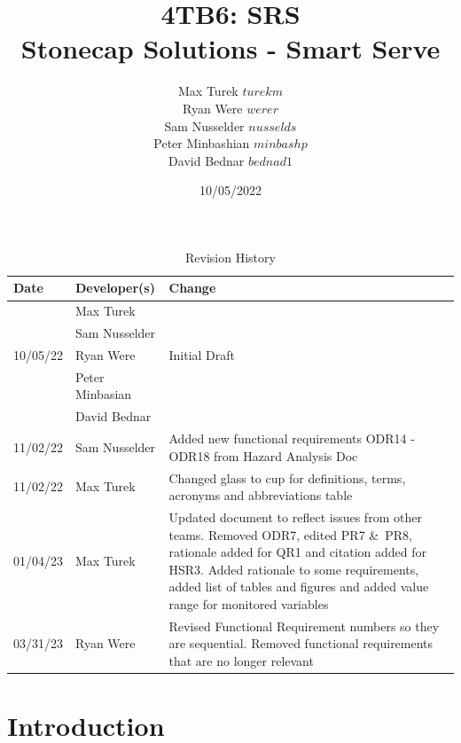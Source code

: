 \documentclass{article}
\title{\textbf{4TB6: SRS}\\
\addlinespace
\addlinespace
\addlinespace
\addlinespace
\large \textbf{Stonecap Solutions - Smart Serve}
\addlinespace
\addlinespace
\addlinespace
\addlinespace}
\author{Max Turek $turekm$\\Ryan Were $werer$\\Sam Nusselder $nusselds$\\Peter Minbashian $minbashp$\\David Bednar $bednad1$}
\date{10/05/2022}
\begin{document}
\maketitle
\newpage
\tableofcontents
\listoffigures
\listoftables

\newpage

    \begin{table}[hp]
    \caption{Revision History} \label{TblRevisionHistory}
    \hline
        \begin{tabularx}{\textwidth}{llX}
        \toprule
        \textbf{Date} & \textbf{Developer(s)} & \textbf{Change}\\
        \midrule
        & Max Turek & \\
        & Sam Nusselder &  \\
        10/05/22 & Ryan Were & Initial Draft\\
        & Peter Minbasian & \\
        & David Bednar & \\
        \bottomrule
        \hline
        \toprule
        \midrule
        11/02/22 & Sam Nusselder & Added new functional requirements ODR14 - ODR18 from Hazard Analysis Doc\\
        \bottomrule
        \hline
        \toprule
        \midrule
        11/02/22 & Max Turek & Changed glass to cup for definitions, terms, acronyms and abbreviations table \\
        \bottomrule
        \hline
        \toprule
        \midrule
        01/04/23 & Max Turek & Updated document to reflect issues from other teams. Removed ODR7, edited PR7 \&\ PR8, rationale added for QR1 and citation added for HSR3. Added rationale to some requirements, added list of tables and figures and added value range for monitored variables\\
        \bottomrule
        \hline
         03/31/23 & Ryan Were & Revised Functional Requirement numbers so they are sequential. Removed functional requirements that are no longer relevant\\
        \hline
        \end{tabularx}
    \end{table}

\newpage
\section{Introduction}
\end{document}
